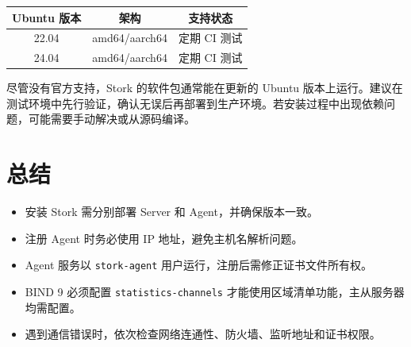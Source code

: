 \documentclass[UTF8, a4paper, 11pt, oneside]{ctexbook}
\begin{document}
\begin{center}
	\begin{tabular}{|c|c|c|}
		\hline
		\textbf{Ubuntu 版本} & \textbf{架构} & \textbf{支持状态} \\
		\hline
		22.04 & amd64/aarch64 & 定期 CI 测试 \\
		\hline
		24.04 & amd64/aarch64 & 定期 CI 测试 \\
		\hline
	\end{tabular}
\end{center}

尽管没有官方支持，Stork 的软件包通常能在更新的 Ubuntu 版本上运行。建议在测试环境中先行验证，确认无误后再部署到生产环境。若安装过程中出现依赖问题，可能需要手动解决或从源码编译。

\chapter{总结}

\begin{itemize}
	\item 安装 Stork 需分别部署 Server 和 Agent，并确保版本一致。
	\item 注册 Agent 时务必使用 IP 地址，避免主机名解析问题。
	\item Agent 服务以 \texttt{stork-agent} 用户运行，注册后需修正证书文件所有权。
	\item BIND 9 必须配置 \texttt{statistics-channels} 才能使用区域清单功能，主从服务器均需配置。
	\item 遇到通信错误时，依次检查网络连通性、防火墙、监听地址和证书权限。
\end{itemize}
\end{document}

